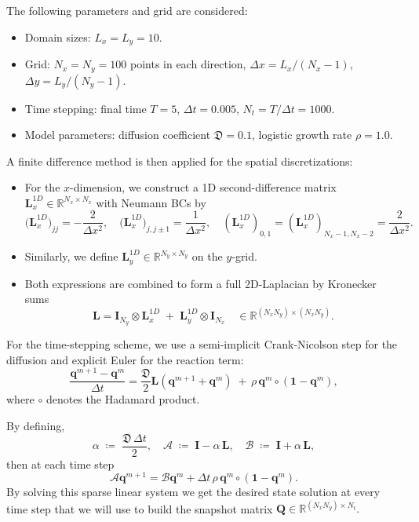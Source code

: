 The following parameters and grid are considered:
\begin{itemize}
  \item Domain sizes: $L_x = L_y = 10$.
  \item Grid: $N_x = N_y = 100$ points in each direction, $\Delta x = L_x/(N_x-1)$, $\Delta y = L_y/(N_y-1)$.
  \item Time stepping: final time $T=5$, $\Delta t=0.005$, $N_t = T/\Delta t = 1000$.
  \item Model parameters: diffusion coefficient $\mathfrak{D}=0.1$, logistic growth rate $\rho=1.0$.
\end{itemize}
A finite difference method is then applied for the spatial discretizations:
\begin{itemize}
  \item For the $x$-dimension, we construct a 1D second-difference matrix $\mathbf{L}_x^{1D}\in\mathbb R^{N_x\times N_x}$ with Neumann BCs by\\
$$\bigl(\mathbf{L}_x^{1D}\bigr)_{jj}= -\frac{2}{\Delta x^2}, \quad \bigl(\mathbf{L}_x^{1D}\bigr)_{j,j\pm1}= \frac{1}{\Delta x^2},
      \quad (\mathbf{L}_x^{1D})_{0,1} = (\mathbf{L}_x^{1D})_{N_x-1,N_x-2} = \frac{2}{\Delta x^2}.$$
  \item Similarly, we define \(\mathbf{L}_y^{1D}\in\mathbb R^{N_y\times N_y}\) on the \(y\)-grid.
  \item Both expressions are combined to form a full 2D-Laplacian by Kronecker sums\\
    $$\mathbf{L} = \mathbf{I}_{N_y}\otimes \mathbf{L}_x^{1D} \;+\; \mathbf{L}_y^{1D}\otimes \mathbf{I}_{N_x}\quad\in\mathbb R^{(N_xN_y)\times(N_xN_y)}.$$
\end{itemize}
For the time-stepping scheme, we use a semi-implicit Crank-Nicolson step for the diffusion and explicit Euler for the reaction term:\\
$$\dfrac{\mathbf{q}^{m+1} - \mathbf{q}^{m}}{\Delta t} = \dfrac{\mathfrak{D}}{2}\mathbf{L}(\mathbf{q}^{m+1}+\mathbf{q}^m)\;+\,\rho\,\mathbf{q}^m\circ(\mathbf{1} - \mathbf{q}^m),$$ 
where $\circ$ denotes the Hadamard product.

By defining,
$$\alpha \;\coloneqq\;\frac{\mathfrak{D}\,\Delta t}{2}, \quad \bm{\mathcal{A}} \;\coloneqq\; \mathbf{I} - \alpha\,\mathbf{L}, \quad \bm{\mathcal{B}} \;\coloneqq\; \mathbf{I} + \alpha\,\mathbf{L},$$
then at each time step\\
$$\bm{\mathcal{A}}\mathbf{q}^{m+1} = \bm{\mathcal{B}}\mathbf{q}^m + \Delta t\,\rho\,\mathbf{q}^m\circ(\mathbf{1} - \mathbf{q}^m).$$
By solving this sparse linear system we get the desired state solution at every time step that we will use to build the snapshot matrix
$\mathbf{Q}\in\mathbb R^{(N_xN_y)\times N_t}.$


